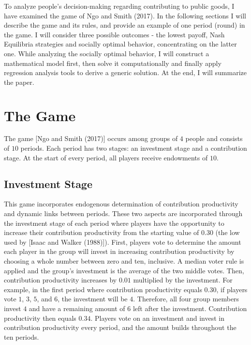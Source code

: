 	To analyze people's decision-making regarding contributing to public goods, I have examined the game of Ngo and Smith (2017). In the following sections I will describe the game and its rules, and provide an example of one period (round) in the game. I will consider three possible outcomes - the lowest payoff, Nash Equilibria strategies and socially optimal behavior, concentrating on the latter one. While analyzing the socially optimal behavior, I will construct a mathematical model first, then solve it computationally and finally apply regression analysis tools to derive a generic solution. At the end, I will summarize the paper.

\section{The Game}

	The game [Ngo and Smith (2017)] occurs among groups of $4$ people and consists of $10$ periods. Each period has two stages: an investment stage and a contribution stage. At the start of every period, all players receive endowments of $10$.
	
	\subsection{Investment Stage}
	
		This game incorporates endogenous determination of contribution productivity and dynamic links between periods. These two aspects are incorporated through the investment stage of each period where players have the opportunity to increase their contribution productivity from the starting value of $0.30$ (the low used by [Isaac and Walker (1988)]). First, players vote to determine the amount each player in the group will invest in increasing contribution productivity by choosing a whole number between zero and ten, inclusive. A median voter rule is applied and the group's investment is the average of the two middle votes. Then, contribution productivity increases by $0.01$ multiplied by the investment. For example, in the first period where contribution productivity equals $0.30$, if players vote $1$, $3$, $5$, and $6$, the investment will be $4$. Therefore, all four group members invest $4$ and have a remaining amount of $6$ left after the investment. Contribution productivity then equals $0.34$. Players vote on an investment and invest in contribution productivity every period, and the amount builds throughout the ten periods.

